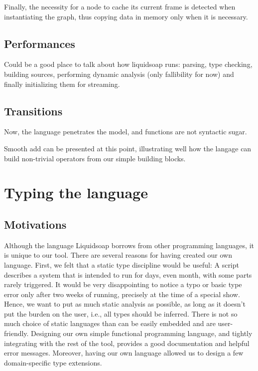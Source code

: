\documentclass{llncs}
\newcommand{\liquidsoap}{Liquidsoap}
\newcommand{\ie}{{i.e.,}}
\begin{document}
Finally, the necessity for a node to cache its current frame is detected when instantiating the graph, thus
copying data in memory only when it is necessary.

\subsection{Performances}

Could be a good place to talk about how liquidsoap runs: parsing, type 
checking, building sources, performing dynamic analysis (only fallibility for 
now) and finally initializing them for streaming.

\subsection{Transitions}

Now, the language penetrates the model, and functions are not syntactic sugar.

Smooth add can be presented at this point,
illustrating well how the langage can build non-trivial operators from
our simple building blocks.

\section{Typing the language}
\subsection{Motivations}
Although the language \liquidsoap{} borrows from other programming languages, it
is unique to our tool.  There are several reasons for having created our own
language.  First, we felt that a static type discipline would be useful: A
script describes a system that is intended to run for days, even month, with
some parts rarely triggered.  It would be very disappointing to notice a typo or
basic type error only after two weeks of running, precisely at the time of a
special show.  Hence, we want to put as much static analysis as possible, as
long as it doesn't put the burden on the user, \ie{} all types should be
inferred.  There is not so much choice of static languages than can be easily
embedded and are user-friendly. Designing our own simple functional programming
language, and tightly integrating with the rest of the tool, provides a good
documentation and helpful error messages.  Moreover, having our own language
allowed us to design a few domain-specific type extensions.
\end{document}
